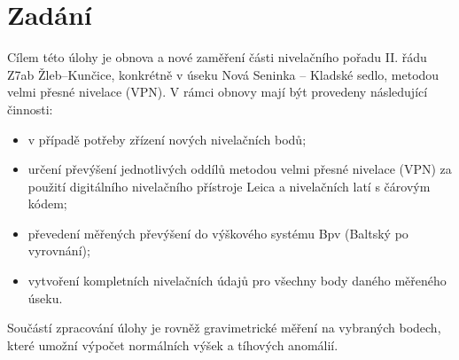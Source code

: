 \section{Zadání}

Cílem této úlohy je obnova a nové zaměření části nivelačního pořadu II. řádu Z7ab Žleb–Kunčice, konkrétně v úseku Nová Seninka – Kladské sedlo, metodou velmi přesné nivelace (VPN). V rámci obnovy mají být provedeny následující činnosti:
\begin{itemize}
    \item v případě potřeby zřízení nových nivelačních bodů;
    \item určení převýšení jednotlivých oddílů metodou velmi přesné nivelace (VPN) za použití digitálního nivelačního přístroje Leica a nivelačních latí s čárovým kódem;
    \item převedení měřených převýšení do výškového systému Bpv (Baltský po vyrovnání);
    \item vytvoření kompletních nivelačních údajů pro všechny body daného měřeného úseku.
\end{itemize}
Součástí zpracování úlohy je rovněž gravimetrické měření na vybraných bodech, které umožní výpočet normálních výšek a tíhových anomálií.\cite{zadani}